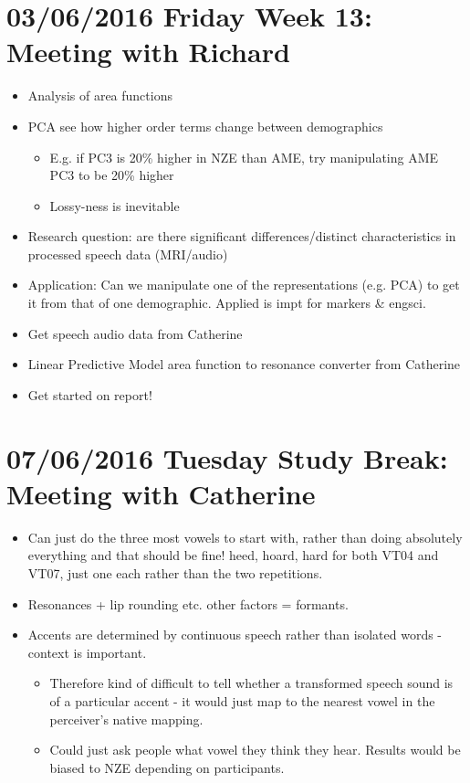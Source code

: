 \documentclass{article}
\begin{document}
\section*{03/06/2016 Friday Week 13: Meeting with Richard}
\begin{itemize}
    \item Analysis of area functions
    \item PCA see how higher order terms change between demographics
    \begin{itemize}
        \item E.g. if PC3 is 20\% higher in NZE than AME, try manipulating AME PC3 to be 20\% higher
        \item Lossy-ness is inevitable 
    \end{itemize}
    \item Research question: are there significant differences/distinct characteristics in processed speech data (MRI/audio)
    \item Application: Can we manipulate one of the representations (e.g. PCA) to get it from that of one demographic. Applied is impt for markers \& engsci.
    \item Get speech audio data from Catherine
    \item Linear Predictive Model area function to resonance converter from Catherine
    \item Get started on report!
\end{itemize}

\section*{07/06/2016 Tuesday Study Break: Meeting with Catherine}
\begin{itemize}
    \item Can just do the three most vowels to start with, rather than doing absolutely everything and that should be fine! heed, hoard, hard for both VT04 and VT07, just one each rather than the two repetitions.
    \item Resonances + lip rounding etc. other factors = formants.
    \item Accents are determined by continuous speech rather than isolated words - context is important.
    \begin{itemize}
        \item Therefore kind of difficult to tell whether a transformed speech sound is of a particular accent - it would just map to the nearest vowel in the perceiver's native mapping.
        \item Could just ask people what vowel they think they hear. Results would be biased to NZE depending on participants.
    \end{itemize}
\end{itemize}
\end{document}
